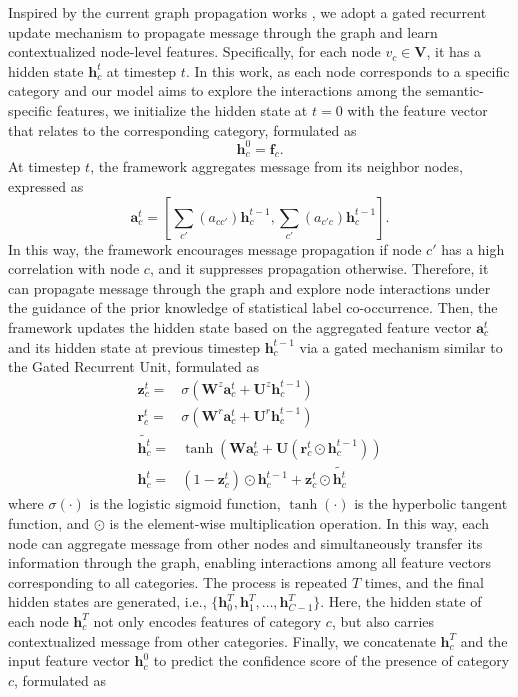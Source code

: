 \documentclass[10pt,twocolumn,letterpaper]{article}
\begin{document}
Inspired by the current graph propagation works \cite{li2015gated,chen2018knowledge,wang2018deep,chen2019knowledge}, we adopt a gated recurrent update mechanism to propagate message through the graph and learn contextualized node-level features. Specifically, for each node $v_c \in \mathbf{V}$, it has a hidden state $\mathbf{h}_c^t$ at timestep $t$. In this work, as each node corresponds to a specific category and our model aims to explore the interactions among the semantic-specific features, we initialize the hidden state at $t=0$ with the feature vector that relates to the corresponding category, formulated as
\begin{equation}
  \mathbf{h}_c^0=\mathbf{f}_{c}.
\end{equation}
At timestep $t$, the framework aggregates message from its neighbor nodes, expressed as
\begin{equation}
  \mathbf{a}_c^t=\left[\sum_{c'}(a_{cc'})\mathbf{h}_c^{t-1}, \sum_{c'}(a_{c'c})\mathbf{h}_c^{t-1}\right].
\end{equation}
In this way, the framework encourages message propagation if node $c'$ has a high correlation with node $c$, and it suppresses propagation otherwise. Therefore, it can propagate message through the graph and explore node interactions under the guidance of the prior knowledge of statistical label co-occurrence. Then, the framework updates the hidden state based on the aggregated feature vector $\mathbf{a}_c^t$ and its hidden state at previous timestep $\mathbf{h}_c^{t-1}$ via a gated mechanism similar to the Gated Recurrent Unit, formulated as
\begin{equation}
   \begin{split}
    \mathbf{z}_c^t=&{}\sigma(\mathbf{W}^z{\mathbf{a}_c^t}+\mathbf{U}^z{\mathbf{h}_c^{t-1}}) \\
    \mathbf{r}_c^t=&{}\sigma(\mathbf{W}^r{\mathbf{a}_c^t}+\mathbf{U}^r{\mathbf{h}_c^{t-1}}) \\
    \widetilde{\mathbf{h}_c^t}=&{}\tanh\left(\mathbf{W}{\mathbf{a}_c^t}+\mathbf{U}({\mathbf{r}_c^t}\odot{\mathbf{h}_c^{t-1}})\right) \\
    \mathbf{h}_c^t=&{}(1-{\mathbf{z}_c^t}) \odot{\mathbf{h}_c^{t-1}}+{\mathbf{z}_c^t}\odot{\widetilde{\mathbf{h}_c^t}}
   \end{split}
   \label{eq:ggnn}
\end{equation}
where $\sigma(\cdot)$ is the logistic sigmoid function, $\tanh(\cdot)$ is the hyperbolic tangent function, and $\odot$ is the element-wise multiplication operation. In this way, each node can aggregate message from other nodes and simultaneously transfer its information through the graph, enabling interactions among all feature vectors corresponding to all categories. The process is repeated $T$ times, and the final hidden states are generated, i.e., $\{\mathbf{h}_0^T, \mathbf{h}_1^T, \dots, \mathbf{h}_{C-1}^T\}$. Here, the hidden state of each node $\mathbf{h}_{c}^T$ not only encodes features of category $c$, but also carries contextualized message from other categories. Finally, we concatenate $\mathbf{h}_{c}^T$ and the input feature vector $\mathbf{h}_{c}^0$ to predict the confidence score of the presence of category $c$, formulated as
\end{document}

